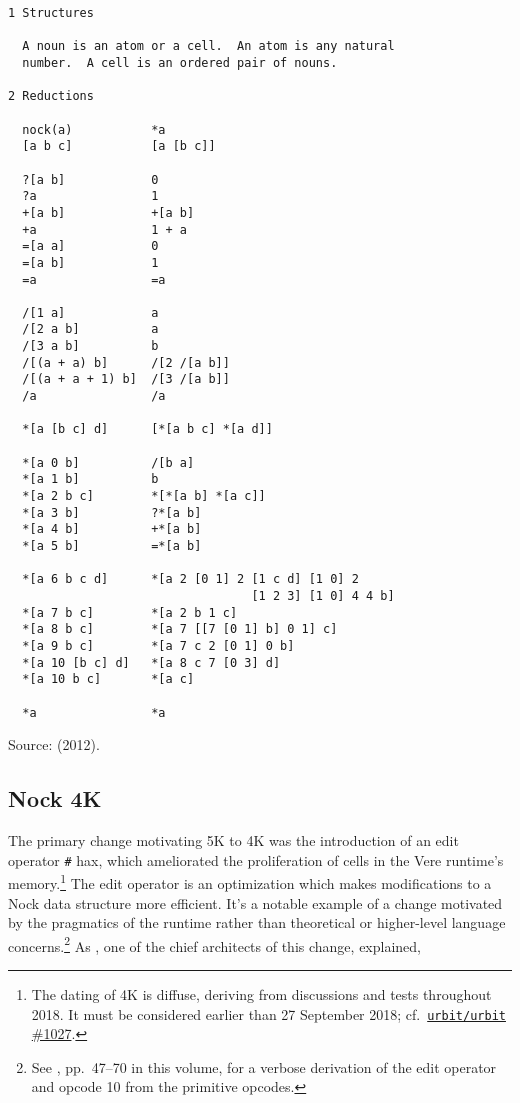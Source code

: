 \documentclass[twoside]{article}
\begin{document}
\begin{lstlisting}[label=lst:nock5k,caption={Nock 5K, 24 September 2012.},style=listingcode]
1 Structures

  A noun is an atom or a cell.  An atom is any natural
  number.  A cell is an ordered pair of nouns.

2 Reductions

  nock(a)           *a
  [a b c]           [a [b c]]

  ?[a b]            0
  ?a                1
  +[a b]            +[a b]
  +a                1 + a
  =[a a]            0
  =[a b]            1
  =a                =a

  /[1 a]            a
  /[2 a b]          a
  /[3 a b]          b
  /[(a + a) b]      /[2 /[a b]]
  /[(a + a + 1) b]  /[3 /[a b]]
  /a                /a

  *[a [b c] d]      [*[a b c] *[a d]]

  *[a 0 b]          /[b a]
  *[a 1 b]          b
  *[a 2 b c]        *[*[a b] *[a c]]
  *[a 3 b]          ?*[a b]
  *[a 4 b]          +*[a b]
  *[a 5 b]          =*[a b]

  *[a 6 b c d]      *[a 2 [0 1] 2 [1 c d] [1 0] 2
                                  [1 2 3] [1 0] 4 4 b]
  *[a 7 b c]        *[a 2 b 1 c]
  *[a 8 b c]        *[a 7 [[7 [0 1] b] 0 1] c]
  *[a 9 b c]        *[a 7 c 2 [0 1] 0 b]
  *[a 10 [b c] d]   *[a 8 c 7 [0 3] d]
  *[a 10 b c]       *[a c]

  *a                *a
\end{lstlisting}

Source:   (2012). %

\subsection{Nock 4K}

The primary change motivating 5K to 4K was the introduction of an edit operator \texttt{\#} hax, which ameliorated the proliferation of cells in the Vere runtime's memory.\footnote{The dating of 4K is diffuse, deriving from discussions and tests throughout 2018.  It must be considered earlier than 27 September 2018; cf.\ \href{https://github.com/urbit/urbit/pull/1027}{\texttt{urbit/urbit} \#1027}.}  The edit operator is an optimization which makes modifications to a Nock data structure more efficient.  It's a notable example of a change motivated by the pragmatics of the runtime rather than theoretical or higher-level language concerns.\footnote{See , pp.~47–70 in this volume, for a verbose derivation of the edit operator and opcode 10 from the primitive opcodes.}  As , one of the chief architects of this change, explained,
\end{document}
